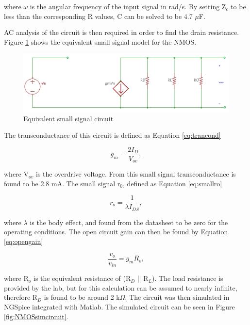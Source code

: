 	where $\omega$ is the angular frequency of the input signal in rad/s. By setting Z$_c$ to be less than the corresponding R values, C can be solved to be 4.7 $\mu$F.
	
	
	 AC analysis of the circuit is then required in order to find the drain resistance. Figure \ref{fig:smallsignalnmos} shows the equivalent small signal model for the NMOS.
	
	
	\begin{figure}[H]
		\centering
		\includegraphics[width=.55\textwidth]{CircuitDevelopment/smallsignal.png}
		\caption{Equivalent small signal circuit}
		\label{fig:smallsignalnmos}
	\end{figure}
	
	The transconductance of this circuit is defined as Equation \ref{eq:trancond}
	
	\begin{equation}\label{eq:trancond}
	g_m = \frac{2I_D}{V_{ov}},
	\end{equation}
	
	where V$_{ov}$ is the overdrive voltage. From this small signal transconductance is found to be 2.8 mA. The small signal r$_0$, defined as Equation \ref{eq:smallro}
	
	\begin{equation}\label{eq:smallro}	
	r_o = \frac{1}{\lambda I_{DS}},	
	\end{equation}
	
	where $\lambda$ is the body effect, and found from the datasheet \cite{NMOS} to be zero for the operating conditions. The open circuit gain can then be found by Equation \ref{eq:opengain} 
	
	\begin{equation}\label{eq:opengain}
	\frac{v_o}{v_{in}} = g_mR_o,
	\end{equation}
	
	where R$_o$ is the equivalent resistance of (R$_D$ || R$_L$). The load resistance is provided by the lab, but for this calculation can be assumed to nearly infinite, therefore R$_D$ is found to be around 2 k$\Omega$. The circuit was then simulated in NGSpice integrated with Matlab. The simulated circuit can be seen in Figure \ref{fig:NMOSsimcircuit}.
	

